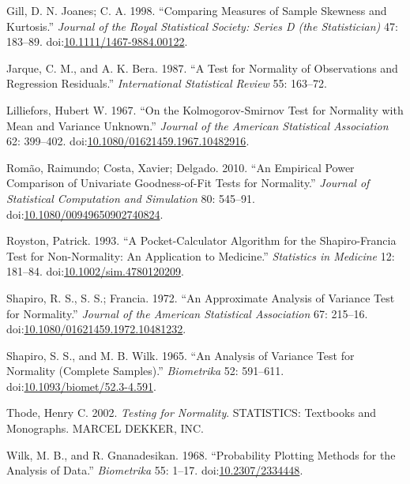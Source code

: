 \documentclass[]{article}
\begin{document}
\hypertarget{ref-Joanes1998}{}
Gill, D. N. Joanes; C. A. 1998. ``Comparing Measures of Sample Skewness
and Kurtosis.'' \emph{Journal of the Royal Statistical Society: Series D
(the Statistician)} 47: 183--89.
doi:\href{https://doi.org/10.1111/1467-9884.00122}{10.1111/1467-9884.00122}.

\hypertarget{ref-JarqueBera1987}{}
Jarque, C. M., and A. K. Bera. 1987. ``A Test for Normality of
Observations and Regression Residuals.'' \emph{International Statistical
Review} 55: 163--72.

\hypertarget{ref-Lilliefors1967}{}
Lilliefors, Hubert W. 1967. ``On the Kolmogorov-Smirnov Test for
Normality with Mean and Variance Unknown.'' \emph{Journal of the
American Statistical Association} 62: 399--402.
doi:\href{https://doi.org/10.1080/01621459.1967.10482916}{10.1080/01621459.1967.10482916}.

\hypertarget{ref-Romao2010}{}
Romão, Raimundo; Costa, Xavier; Delgado. 2010. ``An Empirical Power
Comparison of Univariate Goodness-of-Fit Tests for Normality.''
\emph{Journal of Statistical Computation and Simulation} 80: 545--91.
doi:\href{https://doi.org/10.1080/00949650902740824}{10.1080/00949650902740824}.

\hypertarget{ref-RoystonSF1993}{}
Royston, Patrick. 1993. ``A Pocket-Calculator Algorithm for the
Shapiro-Francia Test for Non-Normality: An Application to Medicine.''
\emph{Statistics in Medicine} 12: 181--84.
doi:\href{https://doi.org/10.1002/sim.4780120209}{10.1002/sim.4780120209}.

\hypertarget{ref-ShapiroFrancia1972}{}
Shapiro, R. S., S. S.; Francia. 1972. ``An Approximate Analysis of
Variance Test for Normality.'' \emph{Journal of the American Statistical
Association} 67: 215--16.
doi:\href{https://doi.org/10.1080/01621459.1972.10481232}{10.1080/01621459.1972.10481232}.

\hypertarget{ref-ShapiroWilk1965}{}
Shapiro, S. S., and M. B. Wilk. 1965. ``An Analysis of Variance Test for
Normality (Complete Samples).'' \emph{Biometrika} 52: 591--611.
doi:\href{https://doi.org/10.1093/biomet/52.3-4.591}{10.1093/biomet/52.3-4.591}.

\hypertarget{ref-Thode2002}{}
Thode, Henry C. 2002. \emph{Testing for Normality}. STATISTICS:
Textbooks and Monographs. MARCEL DEKKER, INC.

\hypertarget{ref-Wilk1968}{}
Wilk, M. B., and R. Gnanadesikan. 1968. ``Probability Plotting Methods
for the Analysis of Data.'' \emph{Biometrika} 55: 1--17.
doi:\href{https://doi.org/10.2307/2334448}{10.2307/2334448}.
\end{document}
